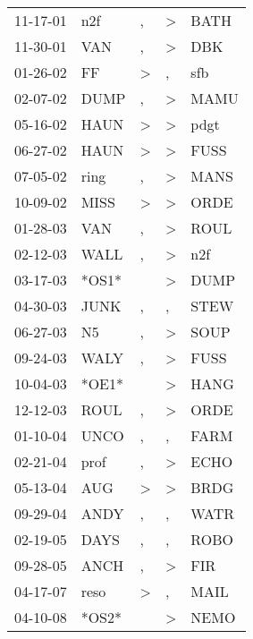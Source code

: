 \begin{supertabular}{lllll}
 11-17-01 &    n2f &                , &     \textgreater &   BATH \\
 11-30-01 &    VAN &                , &     \textgreater &    DBK \\
 01-26-02 &     FF &     \textgreater &                , &    sfb \\
 02-07-02 &   DUMP &                , &     \textgreater &   MAMU \\
 05-16-02 &   HAUN &     \textgreater &     \textgreater &   pdgt \\
 06-27-02 &   HAUN &     \textgreater &     \textgreater &   FUSS \\
 07-05-02 &   ring &                , &     \textgreater &   MANS \\
 10-09-02 &   MISS &     \textgreater &     \textgreater &   ORDE \\
 01-28-03 &    VAN &                , &     \textgreater &   ROUL \\
 02-12-03 &   WALL &                , &     \textgreater &    n2f \\
 03-17-03 &  *OS1* &                  &     \textgreater &   DUMP \\
 04-30-03 &   JUNK &                , &                , &   STEW \\
 06-27-03 &     N5 &                , &     \textgreater &   SOUP \\
 09-24-03 &   WALY &                , &     \textgreater &   FUSS \\
 10-04-03 &  *OE1* &                  &     \textgreater &   HANG \\
 12-12-03 &   ROUL &                , &     \textgreater &   ORDE \\
 01-10-04 &   UNCO &                , &                , &   FARM \\
 02-21-04 &   prof &                , &     \textgreater &   ECHO \\
 05-13-04 &    AUG &     \textgreater &     \textgreater &   BRDG \\
 09-29-04 &   ANDY &                , &                , &   WATR \\
 02-19-05 &   DAYS &                , &                , &   ROBO \\
 09-28-05 &   ANCH &                , &     \textgreater &    FIR \\
 04-17-07 &   reso &     \textgreater &                , &   MAIL \\
 04-10-08 &  *OS2* &                  &     \textgreater &   NEMO \\

\end{supertabular}
